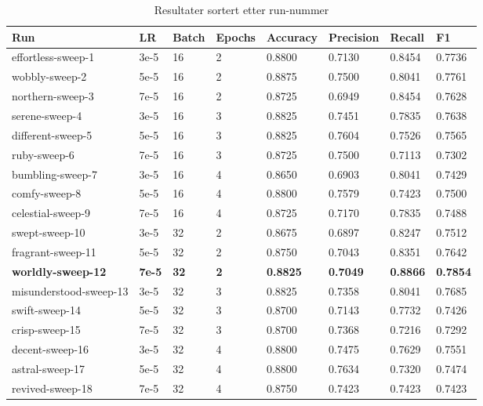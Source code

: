 \begin{table}
\caption{Resultater sortert etter run-nummer}
\label{tab:results}
\begin{tabular}{llllllll}
\toprule
Run & LR & Batch & Epochs & Accuracy & Precision & Recall & F1 \\
\midrule
effortless-sweep-1 & 3e-5 & 16 & 2 & 0.8800 & 0.7130 & 0.8454 & 0.7736 \\
wobbly-sweep-2 & 5e-5 & 16 & 2 & 0.8875 & 0.7500 & 0.8041 & 0.7761 \\
northern-sweep-3 & 7e-5 & 16 & 2 & 0.8725 & 0.6949 & 0.8454 & 0.7628 \\
serene-sweep-4 & 3e-5 & 16 & 3 & 0.8825 & 0.7451 & 0.7835 & 0.7638 \\
different-sweep-5 & 5e-5 & 16 & 3 & 0.8825 & 0.7604 & 0.7526 & 0.7565 \\
ruby-sweep-6 & 7e-5 & 16 & 3 & 0.8725 & 0.7500 & 0.7113 & 0.7302 \\
bumbling-sweep-7 & 3e-5 & 16 & 4 & 0.8650 & 0.6903 & 0.8041 & 0.7429 \\
comfy-sweep-8 & 5e-5 & 16 & 4 & 0.8800 & 0.7579 & 0.7423 & 0.7500 \\
celestial-sweep-9 & 7e-5 & 16 & 4 & 0.8725 & 0.7170 & 0.7835 & 0.7488 \\
swept-sweep-10 & 3e-5 & 32 & 2 & 0.8675 & 0.6897 & 0.8247 & 0.7512 \\
fragrant-sweep-11 & 5e-5 & 32 & 2 & 0.8750 & 0.7043 & 0.8351 & 0.7642 \\
\textbf{worldly-sweep-12} & \textbf{7e-5} & \textbf{32} & \textbf{2} & \textbf{0.8825} & \textbf{0.7049} & \textbf{0.8866} & \textbf{0.7854} \\
misunderstood-sweep-13 & 3e-5 & 32 & 3 & 0.8825 & 0.7358 & 0.8041 & 0.7685 \\
swift-sweep-14 & 5e-5 & 32 & 3 & 0.8700 & 0.7143 & 0.7732 & 0.7426 \\
crisp-sweep-15 & 7e-5 & 32 & 3 & 0.8700 & 0.7368 & 0.7216 & 0.7292 \\
decent-sweep-16 & 3e-5 & 32 & 4 & 0.8800 & 0.7475 & 0.7629 & 0.7551 \\
astral-sweep-17 & 5e-5 & 32 & 4 & 0.8800 & 0.7634 & 0.7320 & 0.7474 \\
revived-sweep-18 & 7e-5 & 32 & 4 & 0.8750 & 0.7423 & 0.7423 & 0.7423 \\
\bottomrule
\end{tabular}
\end{table}
